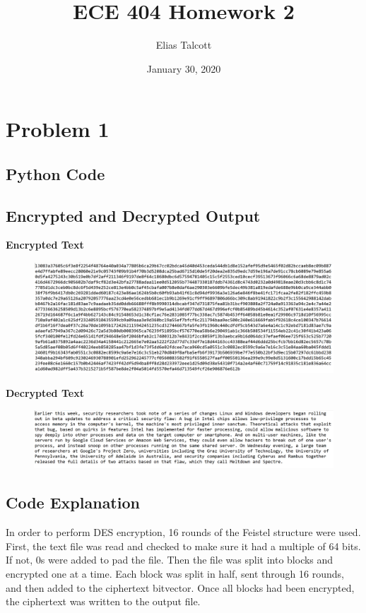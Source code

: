 \documentclass[11pt]{article}
\def \myTitle {ECE 404 Homework 2}
\def \myName {Elias Talcott}
\def \myDate {January 30, 2020}
\begin{document}
\begin{titlepage}
\title{\myTitle}
\author{\myName}
\date{\myDate}
\maketitle
\vspace{1in}
\tableofcontents
\thispagestyle{empty}
\end{titlepage}

\section{Problem 1}
\subsection{Python Code}

\pagebreak

\subsection{Encrypted and Decrypted Output}
\textbf{Encrypted Text}
\begin{figure}[h!]
\includegraphics[width = \linewidth]{encrypted.png}
\end{figure}

\textbf{Decrypted Text}
\begin{figure}[h!]
\includegraphics[width = \linewidth]{decrypted.png}
\end{figure}
\pagebreak

\subsection{Code Explanation}
In order to perform DES encryption, 16 rounds of the Feistel structure were used. First, the text file was read and checked to make sure it had a multiple of 64 bits. If not, 0s were added to pad the file. Then the file was split into blocks and encrypted one at a time. Each block was split in half, sent through 16 rounds, and then added to the ciphertext bitvector. Once all blocks had been encrypted, the ciphertext was written to the output file.
\end{document}
